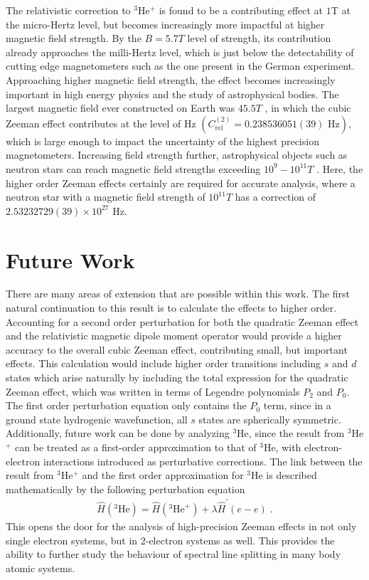         The relativistic correction to $^3$He$^+$ is found to be a contributing effect at $1$T at the micro-Hertz level, but becomes increasingly more impactful at higher magnetic field strength. By the $B = 5.7T$ level of strength, its contribution already approaches the milli-Hertz level, which is just below the detectability of cutting edge magnetometers such as the one present in the German experiment. Approaching higher magnetic field strength, the effect becomes increasingly important in high energy physics and the study of astrophysical bodies. The largest magnetic field ever constructed on Earth was $45.5T$ \cite{Hahn_Kim_Kim_Hu_Painter_Dixon_Kim_Bhattarai_Noguchi_Jaroszynski_et_al._2019}, in which the cubic Zeeman effect contributes at the level of Hz $(C_{\text{rel}}^{(2)} = 0.238536051(39) \text{ Hz})$, which is large enough to impact the uncertainty of the highest precision magnetometers. Increasing field strength further, astrophysical objects such as neutron stars can reach magnetic field strengths exceeding $10^9-10^{11}T$ \cite{Reisenegger_2001}. Here, the higher order Zeeman effects certainly are required for accurate analysis, where a neutron star with a magnetic field strength of $10^{11}T$ has a correction of $2.53232729(39) \times 10^{27}$ Hz.
        
    \section{Future Work}\label{sec:FutureWork}
        There are many areas of extension that are possible within this work. The first natural continuation to this result is to calculate the effects to higher order. Accounting for a second order perturbation for both the quadratic Zeeman effect and the relativistic magnetic dipole moment operator would provide a higher accuracy to the overall cubic Zeeman effect, contributing small, but important effects. This calculation would include higher order transitions including $s$ and $d$ states which arise naturally by including the total expression for the quadratic Zeeman effect, which was written in terms of Legendre polynomials $P_2$ and $P_0$. The first order perturbation equation only contains the $P_0$ term, since in a ground state hydrogenic wavefunction, all $s$ states are spherically symmetric. Additionally, future work can be done by analyzing $^3$He, since the result from $^3$He$^+$ can be treated as a first-order approximation to that of $^3$He, with electron-electron interactions introduced as perturbative corrections. The link between the result from $^3$He$^+$ and the first order approximation for $^3$He is described mathematically by the following perturbation equation
        \begin{align}
            \hat{H}(^3\text{He}) = \hat{H}(^3\text{He}^+) + \lambda \hat{H}^\prime(e-e)\;.
        \end{align}
        \noindent This opens the door for the analysis of high-precision Zeeman effects in not only single electron systems, but in 2-electron systems as well. This provides the ability to further study the behaviour of spectral line splitting in many body atomic systems.

    